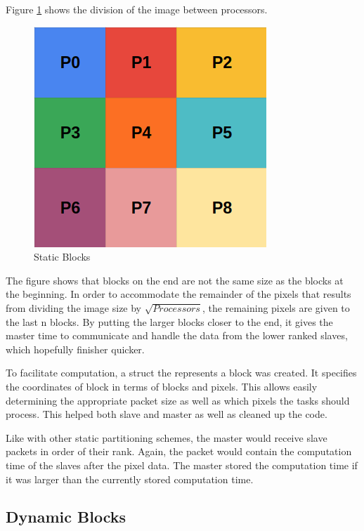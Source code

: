 \documentclass[11pt]{article}
\begin{document}
		Figure \ref{fig:blocks} shows the division of the image between processors.
		
		\begin{figure}[H]
			\centering
			\includegraphics[width=0.7\linewidth]{Pictures/Blocks}
			\caption{Static Blocks}
			\label{fig:blocks}
		\end{figure}
	
		The figure shows that blocks on the end are not the same size as the blocks at the beginning. In order to accommodate the remainder of the pixels that results from dividing the image size by $\sqrt{Processors}$, the remaining pixels are given to the last n blocks. By putting the larger blocks closer to the end, it gives the master time to communicate and handle the data from the lower ranked slaves, which hopefully finisher quicker. 
		
		To facilitate computation, a struct the represents a block was created. It specifies the coordinates of block in terms of blocks and pixels. This allows easily determining the appropriate packet size as well as which pixels the tasks should process. This helped both slave and master as well as cleaned up the code. 
		
		Like with other static partitioning schemes, the master would receive slave packets in order of their rank. Again, the packet would contain the computation time of the slaves after the pixel data. The master stored the computation time if it was larger than the currently stored computation time. 
	
	\subsection{Dynamic Blocks}
	
\end{document}
